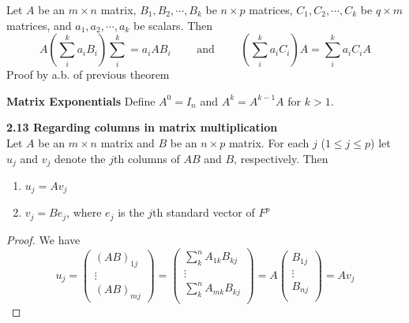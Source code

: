 \documentclass[11pt]{article}
\begin{document}
\begin{corollary*}
    Let $A$ be an $m\times n$ matrix, $B_1,B_2,\cdots, B_k$ be $n\times p$ matrices, $C_1,C_2,\cdots, C_k$ be $q\times m$ matrices, and $a_1,a_2,\cdots, a_k$ be scalars. Then 
    \[
        A\left( \sum_i^k a_i B_i \right) \sum_i^k = a_i AB_i 
        \quad \quad \text{ and } \quad \quad 
        \left( \sum_i^k a_i C_i \right) A = \sum_i^k a_i C_i A
    \]
    Proof by a.b. of previous theorem
\end{corollary*}


\begin{defn*}
    \textbf{Matrix Exponentials} Define $A^0 = I_n$ and $A^k = A^{k-1}A$ for $k > 1$. 
\end{defn*}

\begin{theorem*}
    \textbf{2.13 Regarding columns in matrix multiplication} \\
    Let $A$ be an $m\times n$ matrix and $B$ be an $n\times p$ matrix. For each $j$ ($1\leq j \leq p$) let $u_j$ and $v_j$ denote the $j$th columns of $AB$ and $B$, respectively. Then
    \begin{enumerate}
        \item $u_j = Av_j$ 
        \item $v_j = Be_j$, where $e_j$ is the $j$th standard vector of $F^p$
    \end{enumerate}
    \begin{proof}
        We have 
        \[
            u_j = 
            \begin{pmatrix}
                (AB)_{1j} \\ \vdots \\ (AB)_{mj}    
            \end{pmatrix}    
            =
            \begin{pmatrix}
                \sum_k^n A_{1k} B_{kj} \\
                \vdots \\
                \sum_k^n A_{mk} B_{kj} \\ 
            \end{pmatrix}
            = 
            A
            \begin{pmatrix}
                B_{1j} \\
                \vdots \\
                B_{nj} \\ 
            \end{pmatrix}
            = Av_j
        \]
    \end{proof}
\end{theorem*}
\end{document}
